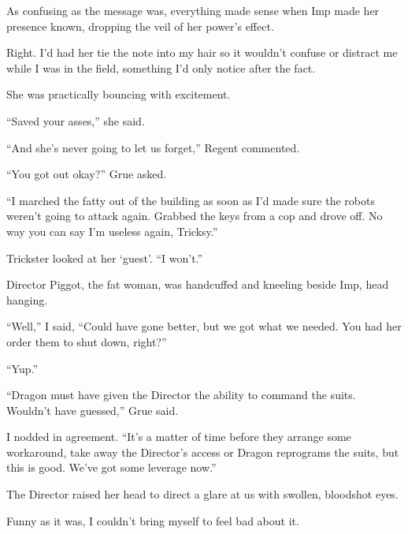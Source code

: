 As confusing as the message was, everything made sense when Imp made her presence known, dropping the veil of her power's effect.



Right.  I'd had her tie the note into my hair so it wouldn't confuse or distract me while I was in the field, something I'd only notice after the fact.



She was practically bouncing with excitement.



``Saved your asses,'' she said.



``And she's never going to let us forget,'' Regent commented.



``You got out okay?'' Grue asked.



``I marched the fatty out of the building as soon as I'd made sure the robots weren't going to attack again.  Grabbed the keys from a cop and drove off.  No way you can say I'm useless again, Tricksy.''



Trickster looked at her `guest'.  ``I won't.''



Director Piggot, the fat woman, was handcuffed and kneeling beside Imp, head hanging.



``Well,'' I said, ``Could have gone better, but we got what we needed.  You had her order them to shut down, right?''



``Yup.''



``Dragon must have given the Director the ability to command the suits.  Wouldn't have guessed,'' Grue said.



I nodded in agreement.  ``It's a matter of time before they arrange some workaround, take away the Director's access or Dragon reprograms the suits, but this is good.  We've got some leverage now.''



The Director raised her head to direct a glare at us with swollen, bloodshot eyes.



Funny as it was, I couldn't bring myself to feel bad about it.





